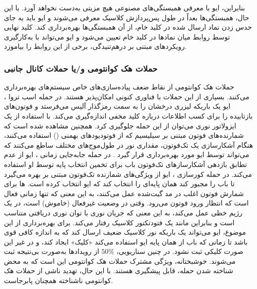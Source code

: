 بنابراین، ایو با معرفی همبستگی‌های مصنوعی هیچ مزیتی به‌دست نخواهد آورد. با این حال، همبستگی‌ها بعداً در طول پس‌پردازش کلاسیک معرفی می‌شوند و ایو باید به جای حدس زدن نماد ارسال شده در کلید خام، از آن همبستگی‌ها بهره‌برداری کند. کلید نهایی توسط روابط میان نمادها در کلید خام تعیین می‌شود و ایو می‌تواند با به‌کارگیری رویکردهای مبتنی بر درهم‌تنیدگی، برخی از این روابط را بیاموزد.








\subsubsection{حملات هک کوانتومی و/یا حملات کانال جانبی}
\label{subsec:7-4-1-4}
حملات هک کوانتومی از نقاط ضعف پیاده‌سازی‌های خاص سیستم‌های  بهره‌برداری می‌کنند. بسیاری از این حملات با فناوری کنونی امکان‌پذیر هستند. در حمله اسب تروا \cite{7-52}، ایو یک باریکه لیزری درخشان را به سمت رمزگذار آلیس می‌فرستد و فوتون‌های بازتابیده را برای کسب اطلاعات درباره کلید مخفی اندازه‌گیری می‌کند. با استفاده از یک ایزولاتور نوری می‌توان از این حمله جلوگیری کرد. همچنین مشاهده شده است که شمارنده‌های فوتون مبتنی بر سیلیسیم که از فوتودیودهای بهمنی () استفاده می‌کنند، هنگام آشکارسازی یک تک‌فوتون، مقداری نور در طول‌موج‌های مختلف ساطع می‌کنند که می‌تواند توسط ایو مورد بهره‌برداری قرار گیرد \cite{7-53}. در حمله جابه‌جایی زمانی \cite{7-54}، ایو از عدم تطابق بازدهی آشکارسازهای تک‌فوتون باب برای تخمین انتخاب پایه توسط او استفاده می‌کند. در حمله کورسازی \cite{7-55}، ایو از ویژگی‌های شمارنده تک‌فوتون مبتنی بر  بهره می‌گیرد تا باب را مجبور کند همان پایه‌ای را انتخاب کند که ایو انتخاب کرده است. ها برای شمارش فوتون اغلب در مد گیت‌شده عمل می‌کنند، به این معنی که  تنها زمانی فعال است که انتظار ورود فوتون می‌رود. وقتی  در وضعیت غیرفعال (خاموش) است، در یک رژیم خطی عمل می‌کند، به این معنی که جریان نوری با توان نوری دریافتی متناسب است و بنابراین مانند یک فتودتکتور کلاسیک رفتار می‌کند. برای بهره‌برداری از این موضوع، ایو می‌تواند یک باریکه نور کلاسیک ضعیف ارسال کند که به اندازه کافی قوی باشد تا زمانی که باب از همان پایه ایو استفاده می‌کند «کلیک» ایجاد کند، و در غیر این صورت کلیکی ثبت نشود. در چنین سناریویی، $50\%$ از رویدادها به‌صورت بی‌نتیجه ثبت می‌شوند. خوشبختانه، ویژگی مشترک حملات هک کوانتومی این است که به محض شناخته شدن حمله، قابل پیشگیری هستند. با این حال، تهدید ناشی از حملات هک کوانتومی ناشناخته همچنان پابرجاست.

